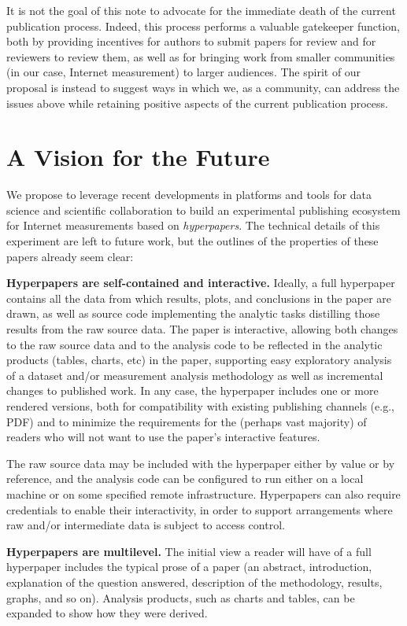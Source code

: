 \documentclass[sigconf]{acmart}
\begin{document}
It is not the goal of this note to advocate for the immediate death of the
current publication process. Indeed, this process performs a valuable gatekeeper
function, both by providing incentives for authors to submit papers for review
and for reviewers to review them, as well as for bringing work from smaller
communities (in our case, Internet measurement) to larger audiences. The spirit
of our proposal is instead to suggest ways in which we, as a community, can
address the issues above while retaining positive aspects of the current
publication process.

\section{A Vision for the Future}
\label{sec:vision}

We propose to leverage recent developments in platforms and tools for data
science and scientific collaboration to build an experimental publishing
ecosystem for Internet measurements based on {\em hyperpapers}. The technical details
of this experiment are left to future work, but the outlines of the properties
of these papers already seem clear:

\textbf{Hyperpapers are self-contained and interactive.} Ideally, a full
hyperpaper contains all the data from which results, plots, and conclusions in
the paper are drawn, as well as source code implementing the analytic tasks
distilling those results from the raw source data. The paper is interactive,
allowing both changes to the raw source data and to the analysis code to be
reflected in the analytic products (tables, charts, etc) in the paper,
supporting easy exploratory analysis of a dataset and/or measurement analysis
methodology as well as incremental changes to published work. In any case, the
hyperpaper includes one or more rendered versions, both for compatibility with
existing publishing channels (e.g., PDF) and to minimize the requirements for
the (perhaps vast majority) of readers who will not want to use the paper's
interactive features.

The raw source data may be included with the hyperpaper either by value or by
reference, and the analysis code can be configured to run either on a local
machine or on some specified remote infrastructure. Hyperpapers can also require
credentials to enable their interactivity, in order to support arrangements
where raw and/or intermediate data is subject to access control.

\textbf{Hyperpapers are multilevel.} The initial view a reader will have of a
full hyperpaper includes the typical prose of a paper (an abstract,
introduction, explanation of the question answered, description of the
methodology, results, graphs, and so on). Analysis products, such as charts and
tables, can be expanded to show how they were derived.
\end{document}

